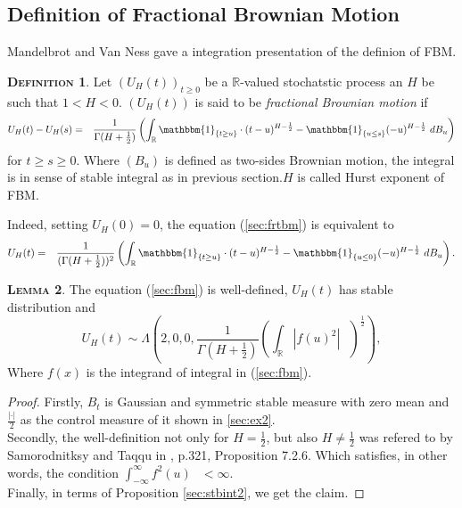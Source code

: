 \documentclass[a4paper, twoside, 11pt]{article}
\theoremstyle{definition}
\newtheorem{definition}{\scshape Definition}[section]
\newtheorem{lemma}[definition]{\scshape Lemma}
\newcommand{\brkt}[1]{\left({#1} \right)}
\begin{document}
\subsection{Definition of Fractional Brownian Motion}
Mandelbrot and Van Ness \cite{mandelbrot} gave a integration presentation of the definion of FBM.
\begin{definition}
  Let $(U_H(t))_{t\ge 0}$ be a $\mathbb{R}$-valued stochatstic process an $H$ be such that $1<H<0$. $(U_H(t))$ is said to be \emph{fractional Brownian motion} if 
  \begin{eqnarray}
	U_H(t) - U_H(s) &=& \frac{1}{\Gamma(H+\frac{1}{2})}\brkt{\int_{\mathbb{R}} \mathbbm{1}_{\{t\ge u\}}\cdot (t-u)^{H-\frac{1}{2}} - \mathbbm{1}_{\{u\le s\}} (-u)^{H-\frac{1}{2}} \, \mathop{dB_u}}
	\label{sec:frtbm}
  \end{eqnarray}
  for $t\ge s \ge 0$. Where $(B_u)$ is defined as two-sides Brownian motion, the integral is in sense of stable integral as in previous section.$H$ is called Hurst exponent of FBM.
\end{definition}

Indeed, setting $U_H(0) = 0$, the equation (\ref{sec:frtbm}) is equivalent to
	 \begin{eqnarray}
	   U_H(t) &=& \frac{1}{(\Gamma(H+\frac{1}{2}))^2}\brkt{\int_{\mathbb{R}} \mathbbm{1}_{\{t\ge u\}}\cdot (t-u)^{H-\frac{1}{2}} - \mathbbm{1}_{\{u\le 0\}} (-u)^{H-\frac{1}{2}} \, \mathop{dB_u}}.
	\label{sec:fbm}
  \end{eqnarray}

\begin{lemma}
  The equation (\ref{sec:fbm}) is well-defined, $U_H(t)$ has stable distribution and 
  \begin{equation*}
	U_H(t) \sim \Lambda(2, 0, 0, \frac{1}{\Gamma(H+\frac{1}{2})}(\int_{\mathbb{R}} |f(u)^2|\, \mathop{\frac{du}{2}})^\frac{1}{2}),
  \end{equation*}
  Where $f(x)$ is the integrand of integral in (\ref{sec:fbm}).
  \label{sec:l2}
\end{lemma}
\begin{proof}
  Firstly, $B_t$ is Gaussian and symmetric stable measure with zero mean and $\frac{|\cdot|}{2}$ as the control measure of it shown in \ref{sec:ex2}. \\
  Secondly, the well-definition not only for $H= \frac{1}{2}$, but also $H\neq \frac{1}{2}$ was refered to by Samorodnitksy and Taqqu in \cite{samorodnitsky}, p.321, Proposition 7.2.6. Which satisfies, in other words, the condition $\int_{-\infty}^{\infty}f^2(u)\,\mathop{\frac{du}{2}} < \infty$.\\
  Finally, in terms of Proposition \ref{sec:stbint2}, we get the claim.
\end{proof}
	
\end{document}
